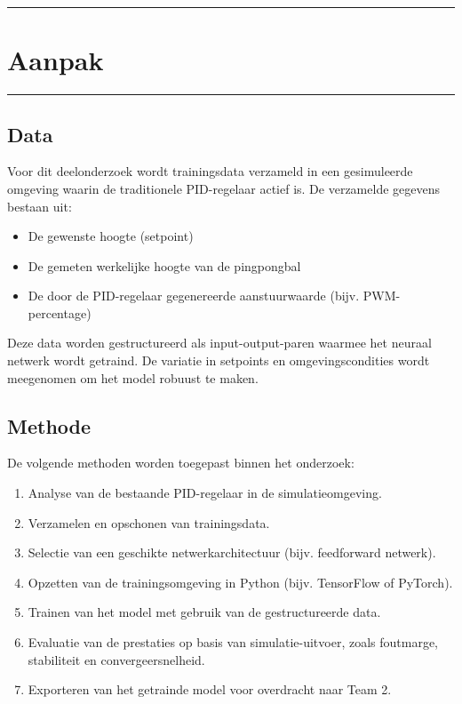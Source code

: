 \vspace{0.3cm}
{\color{gray}\hrule}
\section{Aanpak}
\vspace{0.3cm}
{\color{gray}\hrule}

\subsection{Data}
Voor dit deelonderzoek wordt trainingsdata verzameld in een gesimuleerde omgeving waarin de traditionele PID-regelaar actief is. De verzamelde gegevens bestaan uit:

\begin{itemize}
    \item De gewenste hoogte (setpoint)
    \item De gemeten werkelijke hoogte van de pingpongbal
    \item De door de PID-regelaar gegenereerde aanstuurwaarde (bijv. PWM-percentage)
\end{itemize}

Deze data worden gestructureerd als input-output-paren waarmee het neuraal netwerk wordt getraind. De variatie in setpoints en omgevingscondities wordt meegenomen om het model robuust te maken.

\subsection{Methode}
De volgende methoden worden toegepast binnen het onderzoek:
  
\begin{enumerate}
    \item Analyse van de bestaande PID-regelaar in de simulatieomgeving.
    \item Verzamelen en opschonen van trainingsdata.
    \item Selectie van een geschikte netwerkarchitectuur (bijv. feedforward netwerk).
    \item Opzetten van de trainingsomgeving in Python (bijv. TensorFlow of PyTorch).
    \item Trainen van het model met gebruik van de gestructureerde data.
    \item Evaluatie van de prestaties op basis van simulatie-uitvoer, zoals foutmarge, stabiliteit en convergeersnelheid.
    \item Exporteren van het getrainde model voor overdracht naar Team 2.
\end{enumerate}
  

